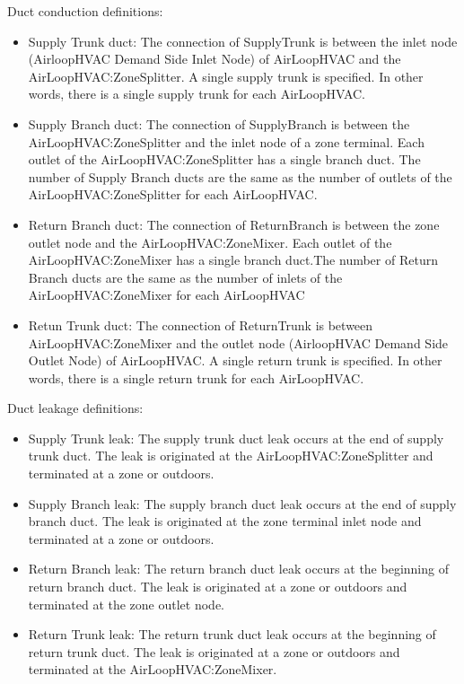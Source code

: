 Duct conduction definitions:

\begin{itemize}
\item
 Supply Trunk duct: The connection of SupplyTrunk is between the inlet node (AirloopHVAC Demand Side Inlet Node) of AirLoopHVAC and the AirLoopHVAC:ZoneSplitter. A single supply trunk is specified. In other words, there is a single supply trunk for each AirLoopHVAC.
\item
 Supply Branch duct: The connection of SupplyBranch is between the AirLoopHVAC:ZoneSplitter and the inlet node of a zone terminal. Each outlet of the AirLoopHVAC:ZoneSplitter has a single branch duct. The number of Supply Branch ducts are the same as the number of outlets of the AirLoopHVAC:ZoneSplitter for each AirLoopHVAC.
\item
 Return Branch duct: The connection of ReturnBranch is between the zone outlet node and the AirLoopHVAC:ZoneMixer.  Each outlet of the AirLoopHVAC:ZoneMixer has a single branch duct.The number of Return Branch ducts are the same as the number of inlets of the AirLoopHVAC:ZoneMixer for each AirLoopHVAC
\item
 Retun Trunk duct: The connection of ReturnTrunk is between AirLoopHVAC:ZoneMixer and the outlet node (AirloopHVAC Demand Side Outlet Node) of AirLoopHVAC. A single return trunk is specified. In other words, there is a single return trunk for each AirLoopHVAC.
\end{itemize}

Duct leakage definitions:

\begin{itemize}
\item
  Supply Trunk leak: The supply trunk duct leak occurs at the end of supply trunk duct. The leak is originated at the AirLoopHVAC:ZoneSplitter and terminated at a zone or outdoors.
\item
  Supply Branch leak: The supply branch duct leak occurs at the end of supply branch duct. The leak is originated at the zone terminal inlet node and terminated at a zone or outdoors.
\item
  Return Branch leak: The return branch duct leak occurs at the beginning of return branch duct. The leak is originated at a zone or outdoors and terminated at the zone outlet node.
\item
  Return Trunk leak: The return trunk duct leak occurs at the beginning of return trunk duct. The leak is originated at a zone or outdoors and terminated at the AirLoopHVAC:ZoneMixer.

\end{itemize}


